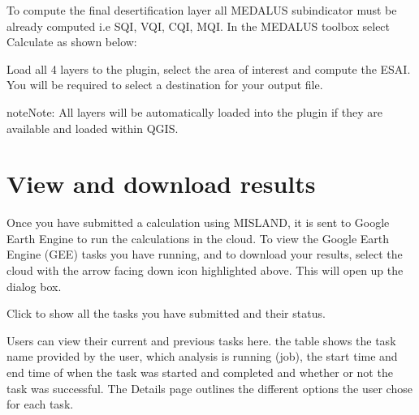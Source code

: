 \documentclass[letterpaper,10pt,english]{sphinxmanual}
\begin{document}
\sphinxAtStartPar
{}

\sphinxAtStartPar
To compute the final desertification layer all MEDALUS subindicator must be already computed i.e SQI, VQI, CQI, MQI.
In the MEDALUS toolbox select Calculate  as shown below:


\sphinxAtStartPar
Load all 4 layers to the plugin, select the area of interest and compute the ESAI. You will be required to
select a destination for your output file.

\begin{sphinxadmonition}{note}{Note:}
\sphinxAtStartPar
All layers will be automatically loaded into the plugin if they are available and loaded within QGIS.
\end{sphinxadmonition}


\sphinxstepscope


\chapter{View and download results}
\label{\detokenize{Qgis_Plugin/gee_tasks:view-and-download-results}}\label{\detokenize{Qgis_Plugin/gee_tasks::doc}}



\sphinxAtStartPar
Once you have submitted a calculation using MISLAND, it is sent to
Google Earth Engine to run the calculations in the cloud. To view the Google
Earth Engine (GEE) tasks you have running, and to download your results, select
the cloud with the arrow facing down icon highlighted above. This will open up the  dialog box.

\sphinxAtStartPar
Click  to show all the tasks you have submitted and their status.

\sphinxAtStartPar
Users can view their current and previous tasks here. the table shows the
task name provided by the user, which analysis is running (job), the start time
and end time of when the task was started and completed and whether or not the
task was successful. The Details page outlines the different options the user
chose for each task.
\end{document}
